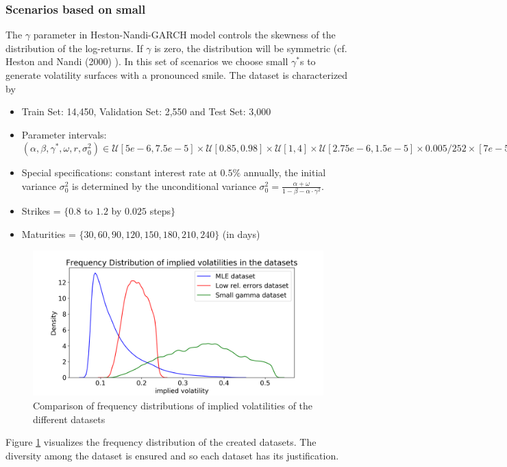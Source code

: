 \documentclass{article}
\begin{document}
\subsubsection{Scenarios based on small \boldmath{$\gamma^*$}}
\label{sec:setupsmallg}
The $\gamma$ parameter in Heston-Nandi-GARCH model controls the skewness of the distribution of the log-returns. If $\gamma$ is zero, the distribution will be symmetric (cf. Heston and Nandi (2000) \cite{HestonNandi}). In this set of scenarios we choose small $\gamma^*$s to generate volatility surfaces with a pronounced smile. The dataset is characterized by 
\begin{itemize}
    \item Train Set: 14,450, Validation Set: 2,550 and Test Set: 3,000
    \item Parameter intervals: $(\alpha, \beta, \gamma^*, \omega, r ,\sigma_0^2) \in \mathcal{U}[5e-6, 7.5e-5] \times \mathcal{U}[0.85, 0.98] \times \mathcal{U}[1, 4] \times \mathcal{U}[2.75e-6, 1.5e-5] \times 0.005/252 \times [7e-5, 0.001]$
    \item Special specifications: constant interest rate at $0.5\%$ annually, the initial variance $\sigma_0^2$ is determined by the unconditional variance  $\sigma_0^2 = \frac{\alpha+\omega}{1-\beta-\alpha\cdot\gamma^2}$.
    \item Strikes = $\{0.8$ to $1.2$ by $0.025$ steps$\}$
    \item Maturities = $\{30, 60, 90, 120, 150, 180, 210, 240\}$ (in days)
\end{itemize}
\begin{figure}[!ht]
\centering
\includegraphics[width=.8\textwidth]{Distribution_Vola_datsets.png}
\caption{Comparison of frequency distributions of implied volatilities of the different datasets}
\label{fig:vol_dist}
\end{figure}
Figure \ref{fig:vol_dist} visualizes the frequency distribution of the created datasets. The diversity among the dataset is ensured and so each dataset has its justification. 
\end{document}
